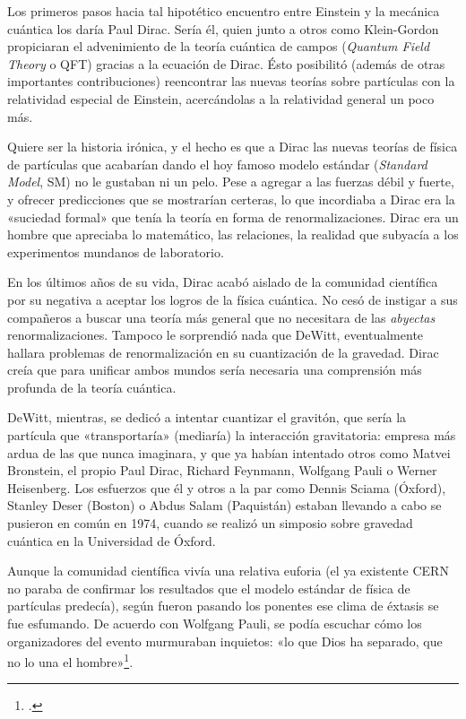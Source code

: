 \documentclass[11pt,a4paper,titlepage]{article}
\begin{document}
Los primeros pasos hacia tal hipotético encuentro entre Einstein y la mecánica cuántica los daría Paul Dirac. Sería él, quien junto a otros como Klein-Gordon propiciaran el advenimiento de la teoría cuántica de campos (\textit{Quantum Field Theory} o QFT) gracias a la ecuación de Dirac. Ésto posibilitó (además de otras importantes contribuciones) reencontrar las nuevas teorías sobre partículas con la relatividad especial de Einstein, acercándolas a la relatividad general un poco más.

Quiere ser la historia irónica, y el hecho es que a Dirac las nuevas teorías de física de partículas que acabarían dando el hoy famoso modelo estándar (\textit{Standard Model}, SM) no le gustaban ni un pelo. Pese a agregar a las fuerzas débil y fuerte, y ofrecer predicciones que se mostrarían certeras, lo que incordiaba a Dirac era la «suciedad formal» que tenía la teoría en forma de renormalizaciones. Dirac era un hombre que apreciaba lo matemático, las relaciones, la realidad que subyacía a los experimentos mundanos de laboratorio.

En los últimos años de su vida, Dirac acabó aislado de la comunidad científica por su negativa a aceptar los logros de la física cuántica. No cesó de instigar a sus compañeros a buscar una teoría más general que no necesitara de las \textit{abyectas} renormalizaciones. Tampoco le sorprendió nada que DeWitt, eventualmente hallara problemas de renormalización en su cuantización de la gravedad. Dirac creía que para unificar ambos mundos sería necesaria una comprensión más profunda de la teoría cuántica.

DeWitt, mientras, se dedicó a intentar cuantizar el gravitón, que sería la partícula que «transportaría» (mediaría) la interacción gravitatoria: empresa más ardua de las que nunca imaginara, y que ya habían intentado otros como Matvei Bronstein, el propio Paul Dirac, Richard Feynmann, Wolfgang Pauli o Werner Heisenberg. Los esfuerzos que él y otros a la par como Dennis Sciama (Óxford), Stanley Deser (Boston) o Abdus Salam (Paquistán) estaban llevando a cabo se pusieron en común en 1974, cuando se realizó un simposio sobre gravedad cuántica en la Universidad de Óxford.

Aunque la comunidad científica vivía una relativa euforia (el ya existente CERN no paraba de confirmar los resultados que el modelo estándar de física de partículas predecía), según fueron pasando los ponentes ese clima de éxtasis se fue esfumando. De acuerdo con Wolfgang Pauli, se podía escuchar cómo los organizadores del evento murmuraban inquietos: «lo que Dios ha separado, que no lo una el hombre»\footnote{\cite[p.~242]{teoriaperfecta}.}.
\end{document}
